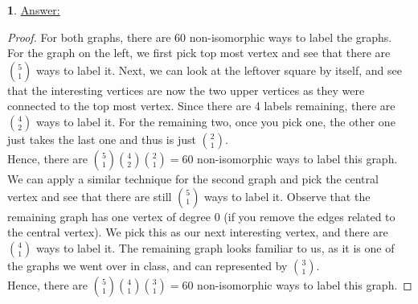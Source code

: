 \documentclass[12pt,a4paper]{article}
\theoremstyle{definition}
\newtheorem{problem}{}
\begin{document}
\begin{problem} \underline{Answer:}
\begin{proof}
For both graphs, there are 60 non-isomorphic ways to label the graphs. \\

For the graph on the left, we first pick top most vertex and see that there are $\binom{5}{1}$ ways to label it. Next, we can look at the leftover square by itself, and see that the interesting vertices are now the two upper vertices as they were connected to the top most vertex. Since there are 4 labels remaining, there are $\binom{4}{2}$ ways to label it. For the remaining two, once you pick one, the other one just takes the last one and thus is just $\binom{2}{1}$. \\

Hence, there are $\binom{5}{1}\binom{4}{2}\binom{2}{1} = 60$ non-isomorphic ways to label this graph. \\

We can apply a similar technique for the second graph and pick the central vertex and see that there are still $\binom{5}{1}$ ways to label it. Observe that the remaining graph has one vertex of degree 0 (if you remove the edges related to the central vertex). We pick this as our next interesting vertex, and there are $\binom{4}{1}$ ways to label it. The remaining graph looks familiar to us, as it is one of the graphs we went over in class, and can represented by $\binom{3}{1}$. \\

Hence, there are $\binom{5}{1}\binom{4}{1}\binom{3}{1} = 60$ non-isomorphic ways to label this graph.
\end{proof}
\end{problem}
\end{document}

